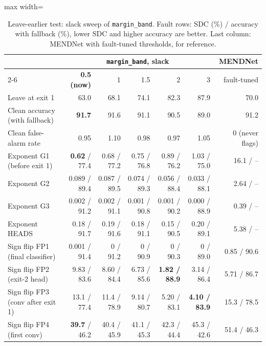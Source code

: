 \documentclass[10pt,a4paper]{article}
\newcommand{\meth}[1]{\texttt{#1}}
\newcommand{\ours}{\meth{margin\_band}}
\begin{document}
\begin{table}[H]
\centering\small
\caption{Leave-earlier test: slack sweep of \ours. Fault rows: SDC (\%) / accuracy with fallback (\%), lower SDC and
higher accuracy are better. Last column: MENDNet with fault-tuned thresholds, for reference.}
\label{tab:slack}
\begin{adjustbox}{max width=\linewidth}
\begin{tabular}{@{}lrrrrrr@{}}
\toprule
 & \multicolumn{5}{c}{\ours, slack} & MENDNet \\
\cmidrule(lr){2-6}
 & \textbf{0.5 (now)} & 1 & 1.5 & 2 & 3 & fault-tuned \\
\midrule
Leave at exit 1                  & 63.0 & 68.1 & 74.1 & 82.3 & 87.9 & 70.0 \\
Clean accuracy (with fallback)   & \textbf{91.7} & 91.6 & 91.1 & 90.5 & 89.0 & 91.2 \\
Clean false-alarm rate           & 0.95 & 1.10 & 0.98 & 0.97 & 1.05 & 0 (never flags) \\
\midrule
Exponent G1 (before exit 1)      & \textbf{0.62} / 77.4 & 0.68 / 77.2 & 0.75 / 76.8 & 0.89 / 76.2 & 1.03 / 75.0 & 16.1 / -- \\
Exponent G2                      & 0.089 / 89.4 & 0.087 / 89.5 & 0.074 / 89.3 & 0.056 / 88.4 & 0.033 / 88.1 & 2.64 / -- \\
Exponent G3                      & 0.002 / 91.2 & 0.002 / 91.1 & 0.001 / 90.8 & 0.001 / 90.2 & 0.000 / 88.9 & 0.39 / -- \\
Exponent HEADS                   & 0.18 / 91.7 & 0.19 / 91.6 & 0.18 / 91.1 & 0.15 / 90.5 & 0.20 / 89.1 & 5.38 / -- \\
\midrule
Sign flip FP1 (final classifier) & 0.001 / 91.4 & 0 / 91.2 & 0 / 90.9 & 0 / 90.3 & 0 / 89.0 & 0.85 / 90.6 \\
Sign flip FP2 (exit-2 head)      & 9.83 / 83.6 & 8.60 / 84.4 & 6.73 / 85.6 & \textbf{1.82 / 88.9} & 3.14 / 86.4 & 5.71 / 86.7 \\
Sign flip FP3 (conv after exit 1)& 13.1 / 77.4 & 11.4 / 78.9 & 9.14 / 80.7 & 5.20 / 83.1 & \textbf{4.10 / 83.9} & 15.3 / 78.5 \\
Sign flip FP4 (first conv)       & \textbf{39.7} / 46.2 & 40.4 / 45.9 & 41.1 / 45.3 & 42.3 / 44.4 & 45.3 / 42.6 & 51.4 / 46.3 \\
\bottomrule
\end{tabular}
\end{adjustbox}
\end{table}
\end{document}
